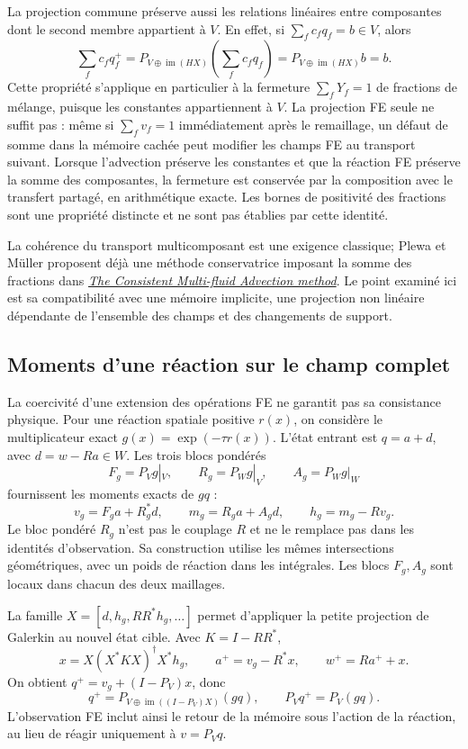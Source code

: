 \documentclass[11pt,a4paper]{article}
\begin{document}
La projection commune préserve aussi les relations linéaires entre
composantes dont le second membre appartient à $V$. En effet, si
$\sum_f c_fq_f=b\in V$, alors
\[
 \sum_f c_fq_f^+
 =P_{V\oplus\operatorname{im}(HX)}\left(\sum_f c_fq_f\right)
 =P_{V\oplus\operatorname{im}(HX)}b=b.
\]
Cette propriété s'applique en particulier à la fermeture
$\sum_fY_f=1$ de fractions de mélange, puisque les constantes
appartiennent à $V$. La projection FE seule ne suffit pas : même si
$\sum_fv_f=1$ immédiatement après le remaillage, un défaut de somme
dans la mémoire cachée peut modifier les champs FE au transport suivant.
Lorsque l'advection préserve les constantes et que la réaction FE
préserve la somme des composantes, la fermeture est conservée par
la composition avec le transfert partagé, en arithmétique exacte.
Les bornes de positivité des fractions sont une propriété distincte
et ne sont pas établies par cette identité.

La cohérence du transport multicomposant est une exigence classique;
Plewa et Müller proposent déjà une méthode conservatrice imposant la
somme des fractions dans
\href{https://arxiv.org/abs/astro-ph/9807241}{\emph{The Consistent Multi-fluid Advection method}}.
Le point examiné ici est sa compatibilité avec une mémoire implicite,
une projection non linéaire dépendante de l'ensemble des champs et
des changements de support.

\subsection{Moments d'une réaction sur le champ complet}
La coercivité d'une extension des opérations FE ne garantit pas sa
consistance physique. Pour une réaction spatiale positive $r(x)$, on
considère le multiplicateur exact $g(x)=\exp(-\tau r(x))$. L'état
entrant est $q=a+d$, avec $d=w-Ra\in W$. Les trois blocs pondérés
\[
 F_g=P_Vg|_V,\qquad R_g=P_Wg|_V,\qquad A_g=P_Wg|_W
\]
fournissent les moments exacts de $gq$ :
\[
 v_g=F_ga+R_g^*d,\qquad m_g=R_ga+A_gd,
 \qquad h_g=m_g-Rv_g.
\]
Le bloc pondéré $R_g$ n'est pas le couplage $R$ et ne le remplace pas
dans les identités d'observation. Sa construction utilise les mêmes
intersections géométriques, avec un poids de réaction dans les intégrales.
Les blocs $F_g,A_g$ sont locaux dans chacun des deux maillages.

La famille $X=[d,h_g,RR^*h_g,\ldots]$ permet d'appliquer la petite
projection de Galerkin au nouvel état cible. Avec $K=I-RR^*$,
\[
 x=X(X^*KX)^\dagger X^*h_g,\qquad
 a^+=v_g-R^*x,\qquad w^+=Ra^++x.
\]
On obtient $q^+=v_g+(I-P_V)x$, donc
\[
 q^+=P_{V\oplus\operatorname{im}((I-P_V)X)}(gq),\qquad
 P_Vq^+=P_V(gq).
\]
L'observation FE inclut ainsi le retour de la mémoire sous l'action
de la réaction, au lieu de réagir uniquement à $v=P_Vq$.
\end{document}
